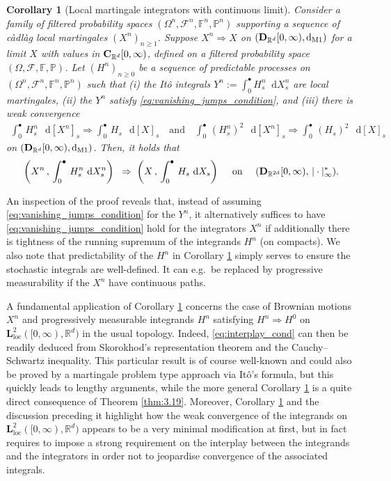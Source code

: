 \documentclass[11pt]{article}
\newtheorem{cor}[theorem]{Corollary}
\theoremstyle{definition}\newtheorem{example}[theorem]{Example}
\theoremstyle{definition}\newtheorem{counterexample}[theorem]{Counterexample}
\theoremstyle{definition}\newtheorem{remark}[theorem]{Remark}
\theoremstyle{definition}\newtheorem{defi}[theorem]{Definition}
\numberwithin{equation}{section}
\newcommand{\R}{\mathbb{R}}
\newcommand{\D}{{\bf D}}											%
\newcommand{\C}{{\bf C}}											%
\newcommand{\F}{\mathbb{F}}											%
\newcommand*\diff{\mathop{}\!\mathrm{d}}								%
\newcommand{\Pro}{\mathbb{P}}										%
\renewcommand{\|}{\; : \, \;}											%
\newcommand{\dM}{\diff_{\operatorname{M1}}}							%
\begin{document}
\begin{cor}[Local martingale integrators with continuous limit] \label{cor:2.14}
	Consider a family of filtered probability spaces $(\Omega^n, \mathcal{F}^n, \F^n, \Pro^n)$ supporting a sequence of càdlàg local martingales $(X^n)_{n\ge 1}$. Suppose $X^n \Rightarrow X$ on $(\D_{\R^d}[0,\infty) ,  \dM )$ for a limit $X$ with values in $\C_{\R^d}[0,\infty)$, defined on a filtered probability space $(\Omega, \mathcal{F}, \F, \Pro)$. Let $(H^n)_{n\ge 0}$ be a sequence of predictable processes on $(\Omega^n, \mathcal{F}^n, \F^n, \Pro^n)$ such that (i) the Itô integrals $Y^n:=\int_0^\bullet H^n_s \diff X^n_s$ are local martingales, (ii) the $Y^n$ satisfy \eqref{eq:vanishing_jumps_condition}, and (iii) there is weak convergence 
	\begin{align} \label{eq:interplay_cond}
		\int_0^\bullet \, H^n_s \, \diff [X^n]_s  \Rightarrow \int_0^\bullet \, H_s \, \diff [X]_s \quad \text{and} \quad  \int_0^\bullet \, (H^n_s)^2 \, \diff [X^n]_s\Rightarrow  \int_0^\bullet \, (H_s)^2 \, \diff [X]_s \end{align}
	on $(\D_{\R^{d}}[0,\infty) , \dM )$. Then, it holds that
	\begin{equation*}
		\left( X^n \, , \, \int_0^\bullet \, H^n_{s} \, \diff X_s^n\right) \;  \; \Rightarrow \; \left( X \, , \, \int_0^\bullet \, H_{s} \, \diff X_s\right) \quad \text{ on } \quad (\D_{\R^{2d}}[0,\infty), \, |\cdot|^*_\infty).
	\end{equation*}
\end{cor}

An inspection of the proof reveals that, instead of assuming \eqref{eq:vanishing_jumps_condition} for the $Y^n$, it alternatively suffices to have \eqref{eq:vanishing_jumps_condition} hold for the integrators $X^n$ if additionally there is tightness of the running supremum of the integrands $H^n$ (on compacts). We also note that predictability of the $H^n$ in Corollary \ref{cor:2.14} simply serves to ensure the stochastic integrals are well-defined. It can e.g.~be replaced by progressive measurability if the $X^n$ have continuous paths.

A fundamental application of Corollary \ref{cor:2.14} concerns the case of Brownian motions $X^n$ and progressively measurable integrands $H^n$ satisfying $H^n \Rightarrow H^0$ on $\textbf{L}_{\text{loc}}^2([0,\infty), \R^d)$ in the usual topology. Indeed, \eqref{eq:interplay_cond} can then be readily deduced from Skorokhod's representation theorem and the Cauchy--Schwartz inequality. This particular result is of course well-known and could also be proved by a martingale problem type approach via It\^o's formula, but this quickly leads to lengthy arguments, while the more general Corollary \ref{cor:2.14} is a quite direct consequence of Theorem \ref{thm:3.19}. Moreover, Corollary \ref{cor:2.14} and the discussion preceding it highlight how the weak convergence of the integrands on $\textbf{L}_{\text{loc}}^2([0,\infty), \R^d)$ appears to be a very minimal modification at first, but in fact requires to impose a strong requirement on the interplay between the integrands and the integrators in order not to jeopardise convergence of the associated integrals.
\end{document}

